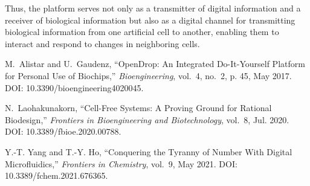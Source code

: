 \documentclass[conference]{IEEEtran}
\begin{document}
Thus, the platform serves not only as a transmitter of digital information and a receiver of biological information but also as a digital channel for transmitting biological information from one artificial cell to another, enabling them to interact and respond to changes in neighboring cells.

\begin{thebibliography}{1}

    M.~Alistar and U.~Gaudenz, ``OpenDrop: An Integrated Do-It-Yourself Platform for Personal Use of Biochips,'' \emph{Bioengineering}, vol.~4, no.~2, p. 45, May 2017. DOI: 10.3390/bioengineering4020045.
    
    N.~Laohakunakorn, ``Cell-Free Systems: A Proving Ground for Rational Biodesign,'' \emph{Frontiers in Bioengineering and Biotechnology}, vol.~8, Jul. 2020. DOI: 10.3389/fbioe.2020.00788.
    
    Y.-T. Yang and T.-Y. Ho, ``Conquering the Tyranny of Number With Digital Microfluidics,'' \emph{Frontiers in Chemistry}, vol.~9, May 2021. DOI: 10.3389/fchem.2021.676365.
    
    \end{thebibliography}
    
\end{document}
